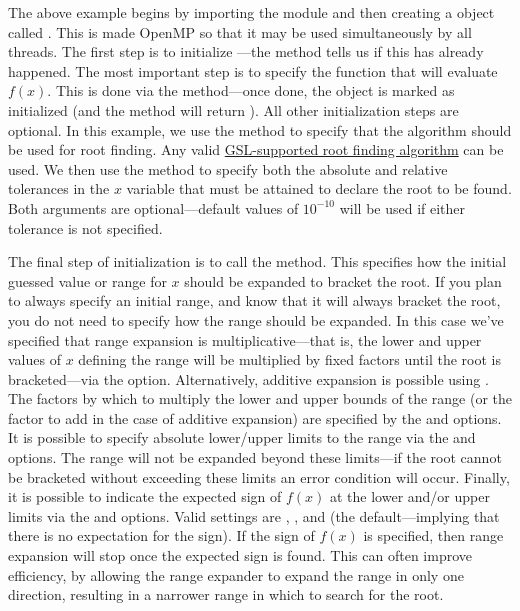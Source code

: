 The above example begins by importing the  module and then creating a  object called . This is made OpenMP  so that it may be used simultaneously by all threads. The first step is to initialize ---the  method tells us if this has already happened. The most important step is to specify the function that will evaluate $f(x)$. This is done via the  method---once done, the  object is marked as initialized (and the  method will return ). All other initialization steps are optional. In this example, we use the  method to specify that the  algorithm should be used for root finding. Any valid \href{http://www.gnu.org/software/gsl/manual/html_node/Root-Bracketing-Algorithms.html}{GSL-supported root finding algorithm} can be used. We then use the  method to specify both the absolute and relative tolerances in the $x$ variable that must be attained to declare the root to be found. Both arguments are optional---default values of $10^{-10}$ will be used if either tolerance is not specified. 

The final step of initialization is to call the  method. This specifies how the initial guessed value or range for $x$ should be expanded to bracket the root. If you plan to always specify an initial range, and know that it will always bracket the root, you do not need to specify how the range should be expanded. In this case we've specified that range expansion is multiplicative---that is, the lower and upper values of $x$ defining the range will be multiplied by fixed factors until the root is bracketed---via the  option. Alternatively, additive expansion is possible using . The factors by which to multiply the lower and upper bounds of the range (or the factor to add in the case of additive expansion) are specified by the  and  options. It is possible to specify absolute lower/upper limits to the range via the  and  options. The range will not be expanded beyond these limits---if the root cannot be bracketed without exceeding these limits an error condition will occur. Finally, it is possible to indicate the expected sign of $f(x)$ at the lower and/or upper limits via the  and  options. Valid settings are , , and  (the default---implying that there is no expectation for the sign). If the sign of $f(x)$ is specified, then range expansion will stop once the expected sign is found. This can often improve efficiency, by allowing the range expander to expand the range in only one direction, resulting in a narrower range in which to search for the root.

